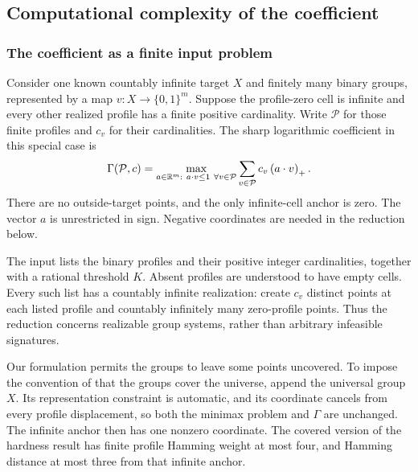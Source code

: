 \subsection{Computational complexity of the coefficient}\label{gm:sec:complexity}

\subsubsection{The coefficient as a finite input problem}
Consider one known countably infinite target $X$ and finitely many binary groups, represented by a map $v:X\to\{0,1\}^m$. Suppose the profile-zero cell is infinite and every other realized profile has a finite positive cardinality. Write $\mathcal P$ for those finite profiles and $c_v$ for their cardinalities. The sharp logarithmic coefficient in this special case is
\begin{equation}\label{gm:eq:coefficient}
\Gamma(\mathcal P,c)=
\max_{a\in\mathbb R^m:\ a\cdot v\le1\ \forall v\in\mathcal P}
\sum_{v\in\mathcal P}c_v\left(a\cdot v\right)_+.
\end{equation}
There are no outside-target points, and the only infinite-cell anchor is zero. The vector $a$ is unrestricted in sign. Negative coordinates are needed in the reduction below.

The input lists the binary profiles and their positive integer cardinalities, together with a rational threshold $K$. Absent profiles are understood to have empty cells. Every such list has a countably infinite realization: create $c_v$ distinct points at each listed profile and countably infinitely many zero-profile points. Thus the reduction concerns realizable group systems, rather than arbitrary infeasible signatures.

Our formulation permits the groups to leave some points uncovered. To impose the convention of \citet{P09} that the groups cover the universe, append the universal group $X$. Its representation constraint is automatic, and its coordinate cancels from every profile displacement, so both the minimax problem and $\Gamma$ are unchanged. The infinite anchor then has one nonzero coordinate. The covered version of the hardness result has finite profile Hamming weight at most four, and Hamming distance at most three from that infinite anchor.

